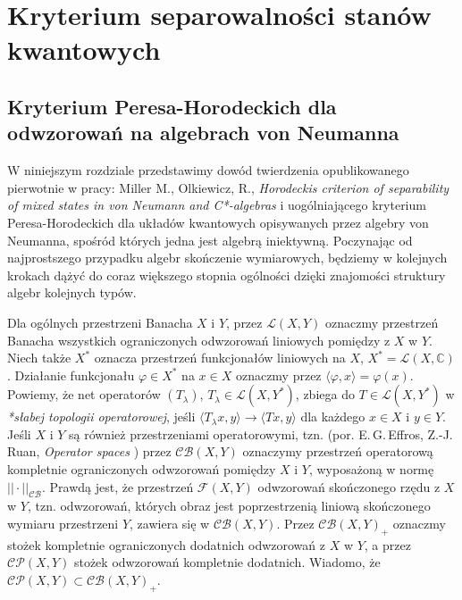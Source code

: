 \chapter{Kryterium separowalności stanów kwantowych}
\label{chp:PHcrit}
\section{Kryterium Peresa-Horodeckich dla odwzorowań na algebrach von Neumanna}
W niniejszym rozdziale przedstawimy dowód twierdzenia
opublikowanego pierwotnie w pracy:
Miller M., Olkiewicz, R.,
\emph{Horodeckis criterion of separability of mixed states in von Neumann and C*-algebras}
\cite{miller2014horodeckis}
i uogólniającego kryterium Peresa-Horodeckich dla układów
kwantowych opisywanych przez algebry von Neumanna,
spośród których jedna jest algebrą iniektywną.
Poczynając od najprostszego przypadku algebr skończenie wymiarowych,
będziemy w kolejnych krokach dążyć do coraz większego stopnia
ogólności dzięki znajomości struktury algebr kolejnych typów.

\vspace{0.5cm}
Dla ogólnych przestrzeni Banacha $X$ i $Y$, przez
$\mathcal{L}(X,Y)$
oznaczmy przestrzeń Banacha wszystkich ograniczonych odwzorowań
liniowych pomiędzy z $X$ w $Y$.
Niech także $X^{*}$ oznacza przestrzeń funkcjonałów liniowych na $X$,
$X^{*} = \mathcal{L}(X, \mathbb{C})$.
Działanie funkcjonału $\varphi \in X^{*}$ na $x \in X$
oznaczmy przez $\langle  \varphi , x \rangle = \varphi(x)$.
Powiemy, że net operatorów $(T_{\lambda})$,
$T_{\lambda} \in \mathcal{L}(X, Y^{*})$, zbiega do
$T \in \mathcal{L}(X, Y^{*})$ w \emph{*słabej topologii operatorowej}, jeśli
\label{page:weakstaroperatortop}
$\langle T_{\lambda} x, y \rangle \rightarrow \langle Tx, y \rangle$
dla każdego $x \in X$ i $y \in Y$.
Jeśli $X$ i $Y$ są również przestrzeniami operatorowymi,
tzn.
(por. E.\,G.\,Effros, Z.-J.\,Ruan, \emph{Operator spaces} \cite{Effros2000})
przez $\mathcal{CB}(X,Y)$ oznaczymy przestrzeń operatorową
kompletnie ograniczonych odwzorowań pomiędzy $X$ i $Y$,
wyposażoną w normę
$|| \cdot ||_{\mathcal{CB}}$.
Prawdą jest, że przestrzeń $\mathcal{F}(X,Y)$
odwzorowań skończonego rzędu z $X$ w $Y$,
tzn. odwzorowań, których obraz jest poprzestrzenią liniową skończonego wymiaru
przestrzeni $Y$, zawiera się w $\mathcal{CB}(X,Y)$.
Przez $\mathcal{CB}(X,Y)_{+}$
oznaczmy stożek kompletnie ograniczonych dodatnich odwzorowań
z $X$ w $Y$, a przez $\mathcal{CP}(X,Y)$ stożek odwzorowań kompletnie dodatnich.
Wiadomo, że $\mathcal{CP}(X,Y) \subset \mathcal{CB}(X,Y)_{+}$.

